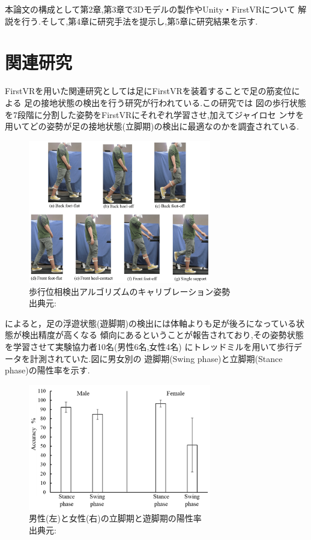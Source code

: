 \documentclass{ltjsreport}
\begin{document}
	本論文の構成として第2章,第3章で3Dモデルの製作やUnity・FirstVRについて
	解説を行う.そして,第4章に研究手法を提示し,第5章に研究結果を示す.

\clearpage
	\section{関連研究}
		FirstVRを用いた関連研究としては足にFirstVRを装着することで足の筋変位による
		足の接地状態の検出を行う研究\cite{ref:6}が行われている.この研究では
		図の歩行状態を7段階に分割した姿勢をFirstVRにそれぞれ学習させ,加えてジャイロセ
		ンサを用いてどの姿勢が足の接地状態(立脚期)の検出に最適なのかを調査されている.
		\begin{figure}[H]
		\centering
		\includegraphics[width = 8cm]{../figs/sensors-21-01081-g004.jpg}
		\caption{歩行位相検出アルゴリズムのキャリブレーション姿勢\\出典元:}
		\label{fig:RR-FVRcalibration}
		\end{figure}

		\cite{ref:6}によると，足の浮遊状態(遊脚期)の検出には体軸よりも足が後ろになっている状態が検出精度が高くなる
		傾向にあるということが報告されており,その姿勢状態を学習させて実験協力者10名(男性6名,女性4名)
		にトレッドミルを用いて歩行データを計測されていた.図に男女別の
		遊脚期(Swing phase)と立脚期(Stance phase)の陽性率を示す.

		\begin{figure}[H]
		\centering
		\includegraphics[width = 8cm]{../figs/sensors-21-01081-g010.jpg}
		\caption{男性(左)と女性(右)の立脚期と遊脚期の陽性率\\出典元:}
		\label{fig:RR-malefemale}
		\end{figure}
\end{document}
